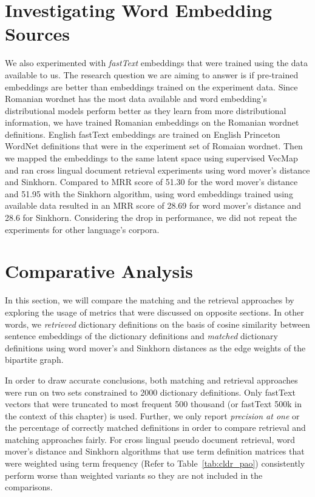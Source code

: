 \section{Investigating Word Embedding Sources}%
\label{sec:investigating_word_embedding_sources}

We also experimented with \emph{fastText} embeddings that were trained using the data available to us.
The research question we are aiming to answer is if pre-trained embeddings are better than embeddings trained on the experiment data.
Since Romanian wordnet has the most data available and word embedding's distributional models perform better as they learn from more distributional information, we have trained Romanian embeddings on the Romanian wordnet definitions.
English fastText embeddings are trained on English Princeton WordNet definitions that were in the experiment set of Romaian wordnet.
Then we mapped the embeddings to the same latent space using supervised VecMap and ran cross lingual document retrieval experiments using word mover's distance and Sinkhorn.
Compared to MRR score of 51.30 for the word mover's distance and 51.95 with the Sinkhorn algorithm, using word embeddings trained using available data resulted in an MRR score of 28.69 for word mover's distance and 28.6 for Sinkhorn.
Considering the drop in performance, we did not repeat the experiments for other language's corpora.

\section{Comparative Analysis}%
\label{sec:comparative_analysis}

In this section, we will compare the matching and the retrieval approaches by exploring the usage of metrics that were discussed on opposite sections.
In other words, we \emph{retrieved} dictionary definitions on the basis of cosine similarity between sentence embeddings of the dictionary definitions and \emph{matched} dictionary definitions using word mover's and Sinkhorn distances as the edge weights of the bipartite graph.

In order to draw accurate conclusions, both matching and retrieval approaches were run on two sets constrained to 2000 dictionary definitions.
Only fastText vectors that were truncated to most frequent 500 thousand (or fastText 500k in the context of this chapter) is used.
Further, we only report \emph{precision at one} or the percentage of correctly matched definitions in order to compare retrieval and matching approaches fairly.
For cross lingual pseudo document retrieval, word mover's distance and Sinkhorn algorithms that use term definition matrices that were weighted using term frequency (Refer to Table~\ref{tab:cldr_pao}) consistently perform worse than \tfidf{} weighted variants so they are not included in the comparisons.

